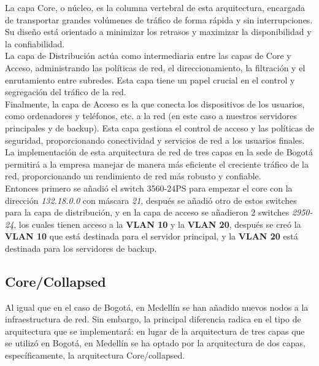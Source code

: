 La capa Core, o núcleo, es la columna vertebral de esta arquitectura, encargada
de transportar grandes volúmenes de tráfico de forma rápida y sin
interrupciones. Su diseño está orientado a minimizar los retrasos y maximizar
la disponibilidad y la confiabilidad.
\\

La capa de Distribución actúa como intermediaria entre las capas de Core y
Acceso, administrando las políticas de red, el direccionamiento, la filtración
y el enrutamiento entre subredes. Esta capa tiene un papel crucial en el
control y segregación del tráfico de la red.
\\

Finalmente, la capa de Acceso es la que conecta los dispositivos de los
usuarios, como ordenadores y teléfonos, etc. a la red (en este caso a nuestros
servidores principales y de backup). Esta capa gestiona el control
de acceso y las políticas de seguridad, proporcionando conectividad y servicios
de red a los usuarios finales.
\\

La implementación de esta arquitectura de red de tres capas en la sede de
Bogotá permitirá a la empresa manejar de manera más eficiente el creciente
tráfico de la red, proporcionando un rendimiento de red más robusto y confiable.
\\

Entonces primero se añadió el switch 3560-24PS para empezar el core con la
dirección \textit{132.18.0.0} con máscara \textit{21}, después se añadió otro de estos switches para la capa de
distribución, y en la capa de acceso se añadieron 2 switches \textit{2950-24}, los
cuales tienen acceso a la \textbf{VLAN 10} y la \textbf{VLAN 20}, después se creó la \textbf{VLAN 10} que
está destinada para el servidor principal, y la \textbf{VLAN 20} está destinada para los
servidores de backup.
\\

\subsection{Core/Collapsed}

Al igual que en el caso de Bogotá, en Medellín se han añadido nuevos nodos a la
infraestructura de red. Sin embargo, la principal diferencia radica en el tipo de arquitectura que se implementará: en lugar de la arquitectura de tres capas que se utilizó en Bogotá, en Medellín se ha optado por la arquitectura de dos capas, específicamente, la arquitectura Core/collapsed.
\\

